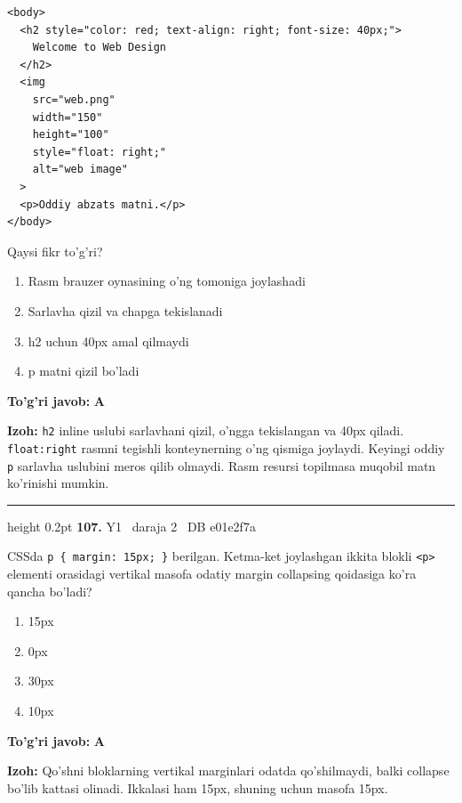 \documentclass[10pt,a4paper,oneside]{article}
\begin{document}
\par
\begin{lstlisting}
<body>
  <h2 style="color: red; text-align: right; font-size: 40px;">
    Welcome to Web Design
  </h2>
  <img
    src="web.png"
    width="150"
    height="100"
    style="float: right;"
    alt="web image"
  >
  <p>Oddiy abzats matni.</p>
</body>
\end{lstlisting}


\par
Qaysi fikr to'g'ri?
\begin{enumerate}[label=\Alph*),leftmargin=9mm]
\item Rasm brauzer oynasining o'ng tomoniga joylashadi
\item Sarlavha qizil va chapga tekislanadi
\item h2 uchun 40px amal qilmaydi
\item p matni qizil bo'ladi
\end{enumerate}
\begin{tcolorbox}[enhanced,breakable,colback=teal!4,colframe=teal!45!black,boxrule=0.45pt,arc=1.2mm,left=2.8mm,right=2.8mm,top=2mm,bottom=2mm,before skip=2mm,after skip=2mm]
\textbf{\color{teal}To'g'ri javob:} \textbf{A}
\par\smallskip
\textbf{Izoh:} \texttt{h2} inline uslubi sarlavhani qizil, o'ngga tekislangan va 40px qiladi. \texttt{float:right} rasmni tegishli konteynerning o'ng qismiga joylaydi. Keyingi oddiy \texttt{p} sarlavha uslubini meros qilib olmaydi. Rasm resursi topilmasa muqobil matn ko'rinishi mumkin.
\end{tcolorbox}
\vspace{2mm}\hrule height 0.2pt \vspace{4mm}
\hypertarget{q107}{\textbf{\color{ink}107.}}  {\color{muted}\scriptsize Y1 \textbullet\ daraja 2 \textbullet\ DB e01e2f7a}
\par
CSSda \texttt{p \{ margin: 15px; \}} berilgan. Ketma-ket joylashgan ikkita blokli \texttt{\textless{}p\textgreater{}} elementi orasidagi vertikal masofa odatiy margin collapsing qoidasiga ko'ra qancha bo'ladi?
\begin{enumerate}[label=\Alph*),leftmargin=9mm]
\item 15px
\item 0px
\item 30px
\item 10px
\end{enumerate}
\begin{tcolorbox}[enhanced,breakable,colback=teal!4,colframe=teal!45!black,boxrule=0.45pt,arc=1.2mm,left=2.8mm,right=2.8mm,top=2mm,bottom=2mm,before skip=2mm,after skip=2mm]
\textbf{\color{teal}To'g'ri javob:} \textbf{A}
\par\smallskip
\textbf{Izoh:} Qo'shni bloklarning vertikal marginlari odatda qo'shilmaydi, balki collapse bo'lib kattasi olinadi. Ikkalasi ham 15px, shuning uchun masofa 15px.
\end{tcolorbox}
\end{document}
